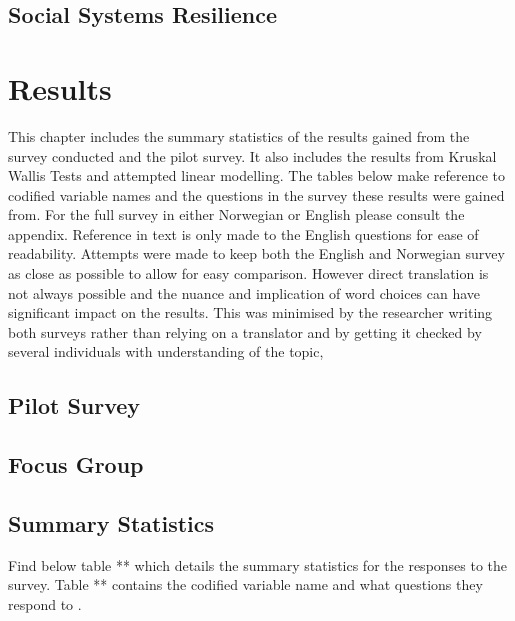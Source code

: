 \section{Social Systems Resilience}

\chapter{Results}
This chapter includes the summary statistics of the results gained from the survey conducted and the pilot survey. It also includes the results from Kruskal Wallis Tests and attempted linear modelling. The tables below make reference to codified variable names and the questions in the survey these results were gained from. For the full survey in either Norwegian or English please consult the appendix. Reference in text is only made to the English questions for ease of readability. Attempts were made to keep both the English and Norwegian survey as close as possible to allow for easy comparison. However direct translation is not always possible and the nuance and implication of word choices can have significant impact on the results. This was minimised by the researcher writing both surveys rather than relying on a translator and by getting it checked by several individuals with understanding of the topic,

\section{Pilot Survey}

\section{Focus Group}

\section{Summary Statistics }
Find below table ** which details the summary statistics for the responses to the survey. Table ** contains the codified variable name and what questions they respond to .



